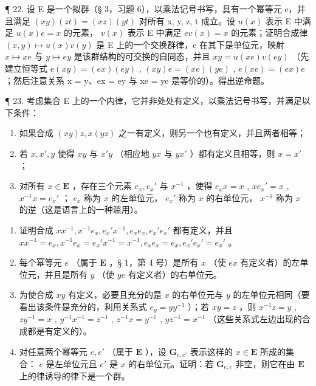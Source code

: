¶ 22. 设 E 是一个拟群（§ 3，习题 6），以乘法记号书写，具有一个幂等元 e，并且满足 \((xy)(zt) = (xz)(yt)\) 对所有 x, y, z, t 成立。设 \(u(x)\) 表示 E 中满足 \(u(x)e = x\) 的元素， \(v(x)\) 表示 E 中满足 \(ev(x) = x\) 的元素；证明合成律 \((x, y) \mapsto u(x)v(y)\) 是 E 上的一个交换群律，e 在其下是单位元，映射 \(x \mapsto xe\) 与 \(y \mapsto ey\) 是该群结构的可交换的自同态，并且 \(xy = u(xe)v(ey)\) （先建立恒等式 \(e(xy) = (ex)(ey)\) , \((xy)e = (xe)(ye)\) , \(e(xe) = (ex)e\) ；然后注意关系 x = y、ex = ey 与 xe = ye 是等价的）。得出逆命题。

¶ 23. 考虑集合 E 上的一个内律，它并非处处有定义，以乘法记号书写，并满足以下条件：

\begin{enumerate}
\def\labelenumi{(\arabic{enumi})}
\item
  如果合成 \((xy)z, x(yz)\) 之一有定义，则另一个也有定义，并且两者相等；
\item
  若 \(x, x', y\) 使得 \(xy\) 与 \(x'y\) （相应地 \(yx\) 与 \(yx'\) ）都有定义且相等，则 \(x = x'\) ；
\item
  对所有 \(x \in \mathbf{E}\) ，存在三个元素 \(e_x, e_x'\) 与 \(x^{-1}\) ，使得 \(e_xx = x\) , \(xe_x' = x\) , \(x^{-1}x = e_x'\) ； \(e_x\) 称为 \(x\) 的左单位元， \(e_x'\) 称为 \(x\) 的右单位元， \(x^{-1}\) 称为 \(x\) 的逆（这是语言上的一种滥用）。
\end{enumerate}

\begin{enumerate}
\def\labelenumi{(\alph{enumi})}
\item
  证明合成 \(xx^{-1}, x^{-1}e_x, e_x'x^{-1}, e_x e_x, e_x' e_x'\) 都有定义，并且 \(xx^{-1} = e_x, x^{-1}e_x = e_x'x^{-1} = x^{-1}, e_x e_x = e_x, e_x' e_x' = e_x'\) 。
\item
  每个幂等元 \(e\) （属于 \(\mathbf{E}\) ，§ 1，第 4 号）是所有 \(x\) （使 \(ex\) 有定义者）的左单位元，并且是所有 \(y\) （使 \(ye\) 有定义者）的右单位元。
\item
  为使合成 \(xy\) 有定义，必要且充分的是 \(x\) 的右单位元与 \(y\) 的左单位元相同（要看出该条件是充分的，利用关系式 \(e_y = yy^{-1}\) ）；若 \(xy = z\) ，则 \(x^{-1}z = y\) , \(zy^{-1} = x\) , \(y^{-1}x^{-1} = z^{-1}\) , \(z^{-1}x = y^{-1}\) , \(yz^{-1} = x^{-1}\) （这些关系式左边出现的合成都是有定义的）。
\item
  对任意两个幂等元 \(e, e'\) （属于 \(\mathbf{E}\) ），设 \(\mathbf{G}_{e, e'}\) 表示这样的 \(x \in \mathbf{E}\) 所成的集合： \(e\) 是左单位元且 \(e'\) 是 \(x\) 的右单位元。证明：若 \(\mathbf{G}_{e, e}\) 非空，则它在由 \(\mathbf{E}\) 上的律诱导的律下是一个群。
\end{enumerate}

